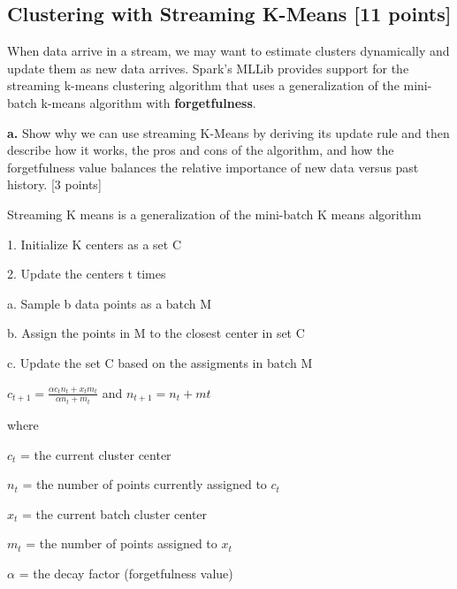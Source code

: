 \documentclass[12pt]{article}
\begin{document}
\subsection{Clustering with Streaming K-Means  [11 points]}
When data arrive in a stream, we may want to estimate clusters dynamically and update them as new data arrives. Spark's MLLib provides support for the streaming k-means clustering algorithm that uses a generalization of the mini-batch k-means algorithm with \textbf{forgetfulness}.

\textbf{a.} Show why we can use streaming K-Means by deriving its update rule and then describe how it works, the pros and cons of the algorithm, and how the forgetfulness value balances the relative importance of new data versus past history. [3 points]

\vspace{5mm}
Streaming K means is a generalization of the mini-batch K means algorithm

1. Initialize K centers as a set C

2. Update the centers t times

\hspace{3mm} a.  Sample b data points as a batch M

\hspace{3mm} b.  Assign the points in M to the closest center in set C

\hspace{3mm} c.  Update the set C based on the assigments in batch M

\hspace{9mm}	$c_{t+1} = \frac{\alpha c_{t}n_{t} + x_{t}m_{t}}{\alpha n_{t} + m_{t}}$ and $n_{t+1} = n_{t} + m{t}$

\hspace{6mm}	where 
	
\hspace{9mm}	$c_{t}$ = the current cluster center
	
\hspace{9mm}	$n_{t}$ = the number of points currently assigned to $c_{t}$
	
\hspace{9mm}	$x_{t}$ = the current batch cluster center
	
\hspace{9mm}	$m_{t}$ = the number of points assigned to $x_{t}$
	
\hspace{9mm}    $\alpha$ = the decay factor (forgetfulness value)
	
\end{document}

